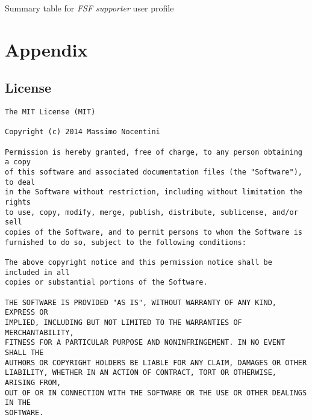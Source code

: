 \documentclass[10pt,a4paper]{article}
\begin{document}
    \begin{table}
      \begin{adjustwidth}{-2cm}{}
        
      \end{adjustwidth}
      \caption{Summary table for \emph{FSF supporter} user profile}
      \label{fig:FSF-supporter-user-profile}
    \end{table}


    \newpage

    \section{Appendix}
    \label{sec:appendix}

    \subsection{License}
\begin{verbatim}
The MIT License (MIT)

Copyright (c) 2014 Massimo Nocentini

Permission is hereby granted, free of charge, to any person obtaining a copy
of this software and associated documentation files (the "Software"), to deal
in the Software without restriction, including without limitation the rights
to use, copy, modify, merge, publish, distribute, sublicense, and/or sell
copies of the Software, and to permit persons to whom the Software is
furnished to do so, subject to the following conditions:

The above copyright notice and this permission notice shall be included in all
copies or substantial portions of the Software.

THE SOFTWARE IS PROVIDED "AS IS", WITHOUT WARRANTY OF ANY KIND, EXPRESS OR
IMPLIED, INCLUDING BUT NOT LIMITED TO THE WARRANTIES OF MERCHANTABILITY,
FITNESS FOR A PARTICULAR PURPOSE AND NONINFRINGEMENT. IN NO EVENT SHALL THE
AUTHORS OR COPYRIGHT HOLDERS BE LIABLE FOR ANY CLAIM, DAMAGES OR OTHER
LIABILITY, WHETHER IN AN ACTION OF CONTRACT, TORT OR OTHERWISE, ARISING FROM,
OUT OF OR IN CONNECTION WITH THE SOFTWARE OR THE USE OR OTHER DEALINGS IN THE
SOFTWARE.
\end{verbatim}
\end{document}
